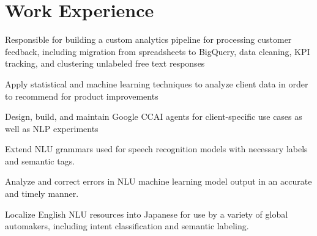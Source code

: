 \documentclass[letterpaper]{deedy-resume_sm} %
\begin{document}

\lastupdated %


\section{Work Experience}
\vspace{\topsep} %
\begin{tightitemize}
\item Responsible for building a custom analytics pipeline for processing customer feedback, including migration from spreadsheets to BigQuery, data cleaning, KPI tracking, and clustering unlabeled free text responses
\item Apply statistical and machine learning techniques to analyze client data in order to recommend for product improvements
\item Design, build, and maintain Google CCAI agents for client-specific use cases as well as NLP experiments
\end{tightitemize}
\sectionspace %
\vspace{\topsep} %
\begin{tightitemize}
\item Extend NLU grammars used for speech recognition models with necessary labels and semantic tags.
\item Analyze and correct errors in NLU machine learning model output in an accurate and timely manner.
\item Localize English NLU resources into Japanese for use by a variety of global automakers, including intent classification and semantic labeling.   
\end{tightitemize}
\end{document}
